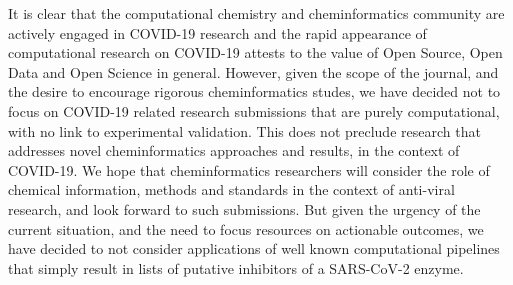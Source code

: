 \documentclass{bmcart}
\begin{document}
It is clear that the computational chemistry and cheminformatics
community are actively engaged in COVID-19 research and the rapid
appearance of computational research on COVID-19 attests to the value
of Open Source, Open Data and Open Science in general. However, given
the scope of the journal, and the desire to encourage rigorous
cheminformatics studes, we have decided not to focus on COVID-19
related research submissions that are purely computational, with no
link to experimental validation. This does not preclude research that
addresses novel cheminformatics approaches and results, in the context
of COVID-19. We hope that cheminformatics researchers will consider
the role of chemical information, methods and standards in the context
of anti-viral research, and look forward to such submissions. But
given the urgency of the current situation, and the need to focus
resources on actionable outcomes, we have decided to not consider
applications of well known computational pipelines that simply result
in lists of putative inhibitors of a SARS-CoV-2 enzyme.
\end{document}

